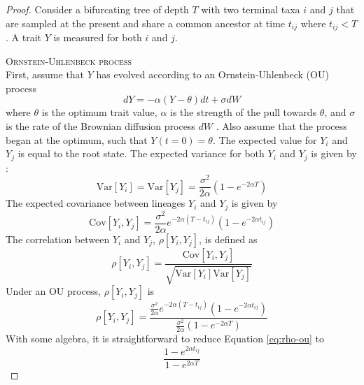 \documentclass[12pt,twoside]{article}
\newcommand{\Var}{\mathrm{Var}}
\newcommand{\Cov}{\mathrm{Cov}}
\begin{document}
\begin{proof}

Consider a bifurcating tree of depth $T$ with two terminal taxa $i$ and $j$ that are sampled at the present and share a common ancestor at time $t_{ij}$ where $t_{ij} < T$. A trait $Y$ is measured for both $i$ and $j$.\bigskip

\par{\textsc{Ornstein-Uhlenbeck process}}\\
First, assume that $Y$ has evolved according to an Ornstein-Uhlenbeck (OU) process 
\begin{equation}
dY = -\alpha(Y - \theta)dt + \sigma dW
\end{equation}
where $\theta$ is the optimum trait value, $\alpha$ is the strength of the pull towards $\theta$, and $\sigma$ is the rate of the Brownian diffusion process $dW$ \citep{Hansen1997}. Also assume that the process began at the optimum, such that $Y(t=0) = \theta$. The expected value for $Y_i$ and $Y_j$ is equal to the root state. The expected variance for both $Y_i$ and $Y_j$ is given by \citet{Hansen1997}:
\begin{equation}\label{eq:var-ou}
\Var[Y_i] = \Var[Y_j] = \frac{\sigma^2}{2\alpha}(1-e^{-2\alpha T})
\end{equation}
The expected covariance between lineages $Y_i$ and $Y_j$ is given by
\begin{equation}
\Cov[Y_i, Y_j] = \frac{\sigma^2}{2\alpha}e^{-2 \alpha (T-t_{ij})}(1-e^{-2\alpha t_{ij}}) 
\end{equation}
The correlation between $Y_i$ and $Y_j$, $\rho[Y_i, Y_j]$, is defined as
\[\rho[Y_i, Y_j] = \frac{\Cov[Y_i, Y_j]}{\sqrt{\Var[Y_i]\Var[Y_j]}}\]
Under an OU process, $\rho[Y_i, Y_j]$ is
\begin{equation}\label{eq:rho-ou}
\rho[Y_i, Y_j] = \frac{\frac{\sigma^2}{2\alpha}e^{-2 \alpha (T-t_{ij})}(1-e^{-2\alpha t_{ij}})}{\frac{\sigma^2}{2\alpha}(1-e^{-2\alpha T})}
\end{equation}
With some algebra, it is straightforward to reduce Equation \ref{eq:rho-ou} to
\begin{equation}
\frac{1-e^{2\alpha t_{ij}}}
{1-e^{2\alpha T}}
\end{equation}\bigskip


\end{proof}
\end{document}
